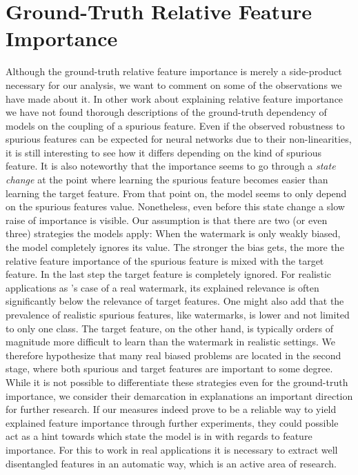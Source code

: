 \section{Ground-Truth Relative Feature Importance}
Although the ground-truth relative feature importance is merely a side-product necessary for our analysis, we want to comment on some of the observations we have made about it. 
In other work about explaining relative feature importance we have not found thorough descriptions of the ground-truth dependency of models on the coupling of a spurious feature. Even if the observed robustness to spurious features can be expected for neural networks due to their non-linearities, it is still interesting to see how it differs depending on the kind of spurious feature.
It is also noteworthy that the importance seems to go through a \textit{state change} at the point where learning the spurious feature becomes easier than learning the target feature. From that point on, the model seems to only depend on the spurious features value. 
Nonetheless, even before this state change a slow raise of importance is visible. Our assumption is that there are two (or even three) strategies the models apply:
When the watermark is only weakly biased, the model completely ignores its value. The stronger the bias gets, the more the relative feature importance of the spurious feature is mixed with the target feature. In the last step the target feature is completely ignored. 
For realistic applications as \citeauthor{Achtibat2022}'s case of a real watermark, its explained relevance is often significantly below the relevance of target features. One might also add that the prevalence of realistic spurious features, like watermarks, is lower and not limited to only one class. The target feature, on the other hand, is typically orders of magnitude more difficult to learn than the watermark in realistic settings.
We therefore hypothesize that many real biased problems are located in the second stage, where both spurious and target features are important to some degree.
While it is not possible to differentiate these strategies even for the ground-truth importance, we consider their demarcation in explanations an important direction for further research.
If our measures indeed prove to be a reliable way to yield explained feature importance through further experiments, they could possible act as a hint towards which state the model is in with regards to feature importance. For this to work in real applications it is necessary to extract well disentangled features in an automatic way, which is an active area of research. 


